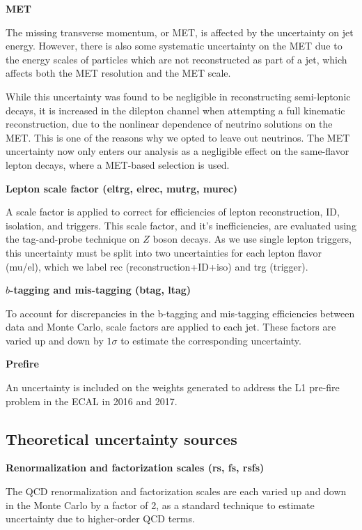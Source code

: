 \par \noindent
\textbf{MET}

The missing transverse momentum, or MET, is affected by the uncertainty on jet energy. However, there is also some systematic uncertainty on the MET due to the energy scales of particles which are not reconstructed as part of a jet, which affects both  the MET resolution and the MET scale.

While  this uncertainty was found to be negligible in reconstructing semi-leptonic decays, it is increased in the dilepton channel when attempting a full kinematic reconstruction, due to the nonlinear dependence of neutrino solutions on the MET. This is one of the reasons why we opted to leave out neutrinos. The MET uncertainty now only enters our analysis as a negligible effect on the same-flavor lepton decays, where a MET-based selection is used.

\par \noindent
\textbf{Lepton scale factor (eltrg, elrec, mutrg, murec)}

A scale factor is applied to correct for efficiencies of lepton reconstruction, ID, isolation, and triggers. This scale factor, and it's inefficiencies, are evaluated using the tag-and-probe technique on $Z$ boson decays. As we use single lepton triggers, this uncertainty must be split into two uncertainties for each lepton flavor (mu/el), which we label rec (reconstruction+ID+iso) and trg (trigger).

\par \noindent
\textbf{$b$-tagging and mis-tagging (btag, ltag)}

To account for discrepancies in the b-tagging and mis-tagging efficiencies between data and Monte Carlo, scale factors are applied to each jet. These factors are varied up and down by $1\sigma$ to estimate the corresponding uncertainty.

\par \noindent
\textbf{Prefire }

An uncertainty is included on the weights generated to address the L1 pre-fire problem in the ECAL in 2016 and 2017.

\subsection{Theoretical uncertainty sources}


\noindent \textbf{Renormalization and factorization scales (rs, fs, rsfs)}

The QCD renormalization and factorization scales are each varied up and down in the Monte Carlo by a factor of 2, as a standard technique to estimate uncertainty due to higher-order QCD terms.

